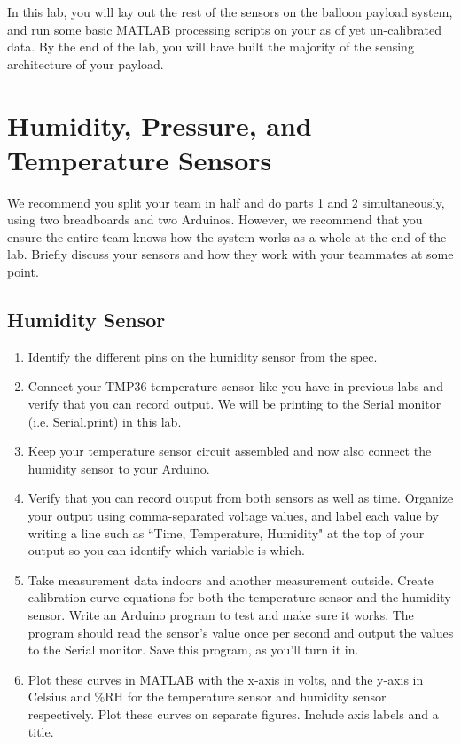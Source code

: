 \documentclass[12pt]{article}
\begin{document}
	In this lab, you will lay out the rest of the sensors on the balloon payload system, and run some basic MATLAB processing scripts on your as of yet un-calibrated data. By the end of the lab, you will have built the majority of the sensing architecture of your payload.
	
	\section{Humidity, Pressure, and Temperature Sensors}
	We recommend you split your team in half and do parts 1 and 2 simultaneously, using two breadboards and two Arduinos. However, we recommend that you ensure the entire team knows how the system works as a whole at the end of the lab. Briefly discuss your sensors and how they work with your teammates at some point.
	
	\subsection*{Humidity Sensor}
	\begin{enumerate}		
		\item Identify the different pins on the humidity sensor from the spec.
		
		\item Connect your TMP36 temperature sensor like you have in previous labs and verify that you can record output. We will be printing to the Serial monitor (i.e. Serial.print) in this lab.
		
		\item Keep your temperature sensor circuit assembled and now also connect the humidity sensor to your Arduino. 
		
		\item Verify that you can record output from both sensors as well as time. Organize your output using comma-separated voltage values, and label each value by writing a line such as  ``Time, Temperature, Humidity" at the top of your output so you can identify which variable is which. 
		
		\item Take measurement data indoors and another measurement outside. Create calibration curve equations for both the temperature sensor and the humidity sensor. Write an Arduino program to test and make sure it works. The program should read the sensor's value once per second and output the values to the Serial monitor. Save this program, as you'll turn it in.
		
		\item Plot these curves in MATLAB with the x-axis in volts, and the y-axis in Celsius and \%RH for the temperature sensor and humidity sensor respectively. Plot these curves on separate figures. Include axis labels and a title.
	
	\end{enumerate}
\end{document}
